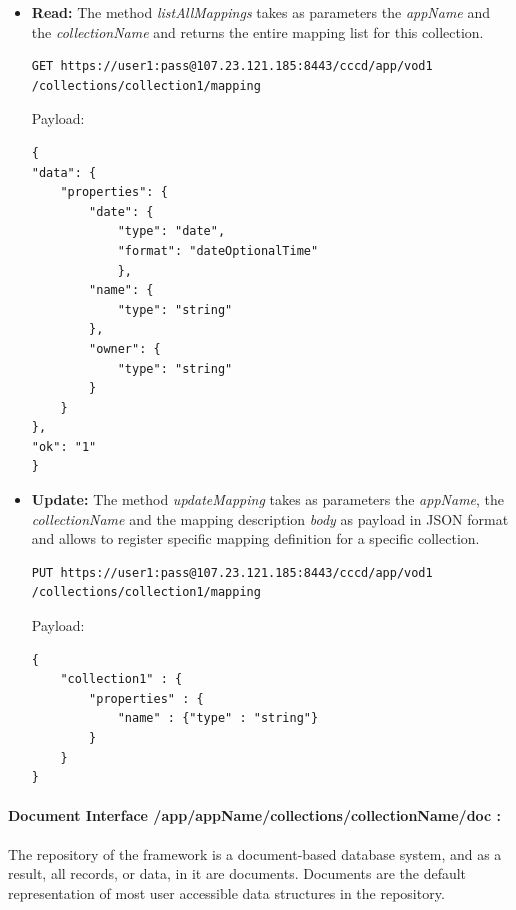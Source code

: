 \begin{itemize}

\item \textbf{Read:} The method \textit{listAllMappings} takes as parameters the \textit{appName} and the \textit{collectionName} and returns the entire mapping list for this collection.

\begin{code}
\begin{verbatim}
GET https://user1:pass@107.23.121.185:8443/cccd/app/vod1
/collections/collection1/mapping
\end{verbatim}
Payload:
\begin{verbatim}
{
"data": {
	"properties": {
		"date": {
			"type": "date",
			"format": "dateOptionalTime"
			},
		"name": {
			"type": "string"
		},
		"owner": {
			"type": "string"
		}
	}
},
"ok": "1"
}

\end{verbatim}
\end{code}

\item \textbf{Update:} The method \textit{updateMapping} takes as parameters the \textit{appName}, the \textit{collectionName} and the mapping description \textit{body} as payload in \ac{JSON} format and allows to register specific mapping definition for a specific collection.

\begin{code}
\begin{verbatim}
PUT https://user1:pass@107.23.121.185:8443/cccd/app/vod1
/collections/collection1/mapping
\end{verbatim}
Payload:
\begin{verbatim}
{
	"collection1" : {
		"properties" : {
			"name" : {"type" : "string"}
		}
	}
}
\end{verbatim}
\end{code}

\end{itemize}


\paragraph{Document Interface /app/{appName}/collections/{collectionName}/doc :} The repository of the framework is a document-based database system, and as a result, all records, or data, in it are documents. Documents are the default representation of most user accessible data structures in the repository.

